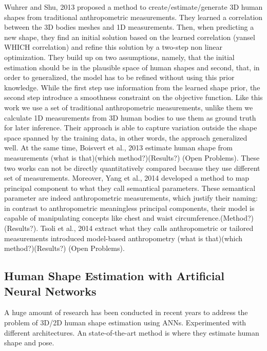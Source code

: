 \documentclass[runningheads, orivec]{llncs}
\begin{document}
Wuhrer and Shu, 2013 \cite{Wuhrer.2013} proposed a method to 
create/estimate/generate 3D human shapes from traditional anthropometric 
measurements. They learned a correlation between the 3D bodies meshes and 1D 
measurements. Then, when predicting a new shape, they find an initial solution 
based on the learned correlation (yansel WHICH correlation) and refine this 
solution by a two-step non linear optimization. They build up on two 
assumptions, namely, that the initial estimation should be in the plausible 
space of human shapes and second, that, in order to generalized, the model has 
to be refined without using this prior knowledge. While the first step use 
information from the learned shape prior, the second step introduce a 
smoothness constraint on the objective function. Like this work we use a set of 
traditional anthropometric measurements, unlike them we calculate 1D 
measurements from 3D human bodies to use them as ground truth for later 
inference. Their approach is able to capture variation outside the shape space 
spanned by the training data, in other words, the approach generalized well.
At the same time, Boisvert et al., 2013 \cite{Boisvert.2013} estimate human 
shape from measurements (what is that)(which method?)(Results?) (Open 
Problems). These two works can not be directly quantitatively compared because 
they use different set of measurements.
Moreover, Yang et al., 2014 \cite{Yang.2014} developed a method to map 
principal component to what they call semantical parameters. These semantical 
parameter are indeed anthropometric measurements, which justify their naming: 
in contrast to anthropometric meaningless principal components, their model is 
capable of manipulating concepts like chest and waist 
circumference.(Method?)(Results?).   
Tsoli et al., 2014 \cite{Tsoli.2014} extract what they calls anthropometric or 
tailored measurements introduced model-based anthropometry (what is that)(which 
method?)(Results?) (Open Problems).

\subsection{Human Shape Estimation with Artificial Neural Networks}
A huge amount of research has been conducted in recent years to address the 
problem of 3D/2D human shape estimation using ANNs. Experimented with different 
architectures.
An state-of-the-art method is \cite{kanazawaHMR18} where they estimate human 
shape and pose.

\end{document}
